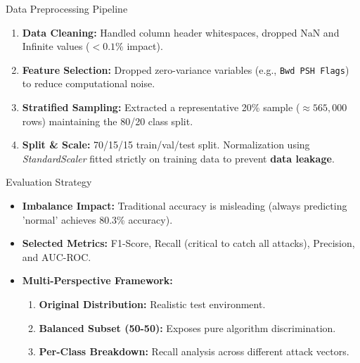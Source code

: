 \documentclass[10pt]{beamer}
\begin{document}
\begin{frame}{Data Preprocessing Pipeline}
  \begin{enumerate}
    \item \textbf{Data Cleaning:} Handled column header whitespaces, dropped NaN and Infinite values ($<0.1\%$ impact).
    \item \textbf{Feature Selection:} Dropped zero-variance variables (e.g., \texttt{Bwd PSH Flags}) to reduce computational noise.
    \item \textbf{Stratified Sampling:} Extracted a representative 20\% sample ($\approx 565,000$ rows) maintaining the 80/20 class split.
    \item \textbf{Split \& Scale:} 70/15/15 train/val/test split. Normalization using \textit{StandardScaler} fitted strictly on training data to prevent \textbf{data leakage}.
  \end{enumerate}
\end{frame}

\begin{frame}{Evaluation Strategy}
  \begin{itemize}
    \item \textbf{Imbalance Impact:} Traditional accuracy is misleading (always predicting 'normal' achieves 80.3\% accuracy).
    \item \textbf{Selected Metrics:} F1-Score, Recall (critical to catch all attacks), Precision, and AUC-ROC.
    \item \textbf{Multi-Perspective Framework:}
    \begin{enumerate}
      \item \textbf{Original Distribution:} Realistic test environment.
      \item \textbf{Balanced Subset (50-50):} Exposes pure algorithm discrimination.
      \item \textbf{Per-Class Breakdown:} Recall analysis across different attack vectors.
    \end{enumerate}
  \end{itemize}
\end{frame}

\end{document}
